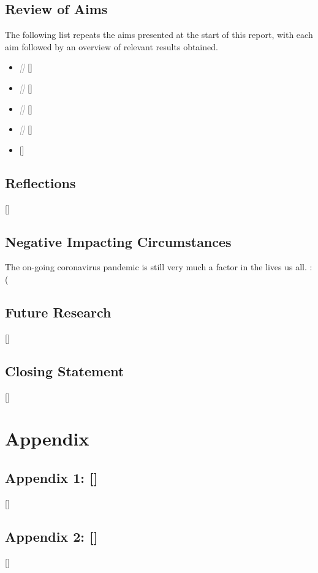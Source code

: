 \documentclass{article}
\begin{document}
    \subsection{Review of Aims}
        The following list repeats the aims presented at the start of this report, with each aim followed by an overview of relevant results obtained.
        \begin{itemize}
            \item \textcolor{gray}{\textit{[]}}
                []
            \item \textcolor{gray}{\textit{[]}}
                []
            \item \textcolor{gray}{\textit{[]}}
                []
            \item \textcolor{gray}{\textit{[]}}
                []
            \item \textcolor{gray}{\textit{}}
                []
        \end{itemize}
    \subsection{Reflections}
        []
    \subsection{Negative Impacting Circumstances}
        The on-going coronavirus pandemic is still very much a factor in the lives us all. :(
    \subsection{Future Research}
        []
    \subsection{Closing Statement}
        []

\newpage
\section*{Appendix}
    \subsection*{Appendix 1: []}
        []
    \subsection*{Appendix 2: []}
        []
\end{document}
